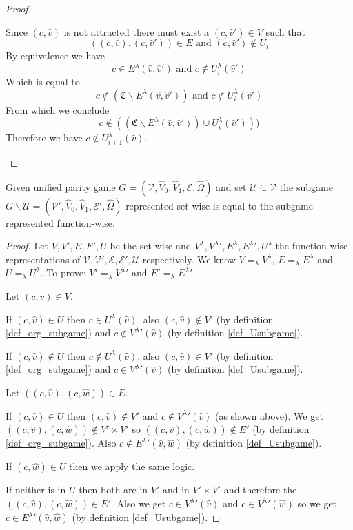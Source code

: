 \begin{lemma}
\begin{proof}
\begin{itemize}
			Since $(c,\hat{v})$ is not attracted there must exist a $(c,\hat{v}') \in V$ such that 
			\[ ((c,\hat{v}),(c,\hat{v}')) \in E  \text{ and } (c,\hat{v}') \notin U_i \]
			By equivalence we have 
			\[ c \in E^\lambda(\hat{v},\hat{v}')  \text{ and } c \notin U^\lambda_i(\hat{v}') \]
			Which is equal to
			\[ c \notin (\mathfrak{C} \backslash E^\lambda(\hat{v},\hat{v}'))  \text{ and } c \notin U^\lambda_i(\hat{v}') \]
			From which we conclude
			\[ c \notin ((\mathfrak{C} \backslash E^\lambda(\hat{v},\hat{v}')) \cup U^\lambda_i(\hat{v}'))) \]
			Therefore we have $c \notin U^\lambda_{i+1}(\hat{v})$.
		\end{itemize}
	\end{proof}
\end{lemma}

\begin{lemma}
	\label{lem_subgame_eq}
	Given unified parity game $G = (\mathcal{V},\hat{V}_0,\hat{V}_1, \mathcal{E}, \hat{\Omega})$ and set $\mathcal{U} \subseteq \mathcal{V}$ the subgame $G \backslash \mathcal{U} = (\mathcal{V}',\hat{V}_0,\hat{V}_1,\mathcal{E}',\hat{\Omega})$ represented set-wise is equal to the subgame represented function-wise.
	\begin{proof}
		Let $V,V',E,E',U$ be the set-wise and $V^\lambda,{V^\lambda}', E^\lambda, {E^\lambda}', U^\lambda$ the function-wise representations of $\mathcal{V},\mathcal{V}', \mathcal{E}, \mathcal{E}', \mathcal{U}$ respectively. We know $V =_\lambda V^\lambda$, $E =_\lambda E^\lambda$ and $U =_\lambda U^\lambda$. To prove: $V' =_\lambda {V^\lambda}'$ and $E' =_\lambda {E^\lambda}'$.
		
		Let $(c,\hat{v}) \in V$.
		
		If $(c,\hat{v}) \in U$ then $c \in U^\lambda(\hat{v})$, also $(c,\hat{v}) \notin V'$ (by definition \ref{def_org_subgame}) and $c \notin {V^\lambda}'(\hat{v})$ (by definition \ref{def_Usubgame}).
		
		If $(c,\hat{v}) \notin U$ then $c \notin U^\lambda(\hat{v})$, also $(c,\hat{v}) \in V'$ (by definition \ref{def_org_subgame}) and $c \in {V^\lambda}'(\hat{v})$ (by definition \ref{def_Usubgame}).
		
		Let $((c,\hat{v}),(c,\hat{w})) \in E$.
		
		If $(c,\hat{v}) \in U$ then $(c,\hat{v}) \notin V'$ and $c \notin {V^\lambda}'(\hat{v})$ (as shown above). We get $((c,\hat{v}),(c,\hat{w})) \notin V' \times V'$ so $((c,\hat{v}),(c,\hat{w})) \notin E'$ (by definition \ref{def_org_subgame}). Also $c \notin {E^\lambda}'(\hat{v},\hat{w})$ (by definition \ref{def_Usubgame}).
		
		If $(c,\hat{w}) \in U$ then we apply the same logic.
		
		If neither is in $U$ then both are in $V'$ and in $V' \times V'$ and therefore the $((c,\hat{v}),(c,\hat{w})) \in E'$. Also we get $c \in {V^\lambda}'(\hat{v})$ and $c \in {V^\lambda}'(\hat{w})$ so we get $c \in {E^\lambda}'(\hat{v},\hat{w})$ (by definition \ref{def_Usubgame}).
	\end{proof}
\end{lemma}


